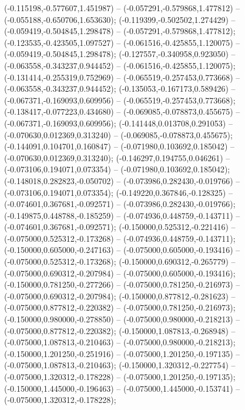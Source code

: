  (-0.115198,-0.577607,1.451987) -- (-0.057291,-0.579868,1.477812) -- (-0.055188,-0.650706,1.653630);
 (-0.119399,-0.502502,1.274429) -- (-0.059419,-0.504845,1.298478) -- (-0.057291,-0.579868,1.477812);
 (-0.123535,-0.423505,1.097527) -- (-0.061516,-0.425855,1.120075) -- (-0.059419,-0.504845,1.298478);
 (-0.127557,-0.340958,0.923050) -- (-0.063558,-0.343237,0.944452) -- (-0.061516,-0.425855,1.120075);
 (-0.131414,-0.255319,0.752969) -- (-0.065519,-0.257453,0.773668) -- (-0.063558,-0.343237,0.944452);
 (-0.135053,-0.167173,0.589426) -- (-0.067371,-0.169093,0.609956) -- (-0.065519,-0.257453,0.773668);
 (-0.138417,-0.077223,0.434680) -- (-0.069085,-0.078873,0.455675) -- (-0.067371,-0.169093,0.609956);
 (-0.141448,0.013708,0.291053) -- (-0.070630,0.012369,0.313240) -- (-0.069085,-0.078873,0.455675);
 (-0.144091,0.104701,0.160847) -- (-0.071980,0.103692,0.185042) -- (-0.070630,0.012369,0.313240);
 (-0.146297,0.194755,0.046261) -- (-0.073106,0.194071,0.073354) -- (-0.071980,0.103692,0.185042);
 (-0.148018,0.282823,-0.050702) -- (-0.073986,0.282430,-0.019766) -- (-0.073106,0.194071,0.073354);
 (-0.149220,0.367846,-0.128325) -- (-0.074601,0.367681,-0.092571) -- (-0.073986,0.282430,-0.019766);
 (-0.149875,0.448788,-0.185259) -- (-0.074936,0.448759,-0.143711) -- (-0.074601,0.367681,-0.092571);
 (-0.150000,0.525312,-0.221416) -- (-0.075000,0.525312,-0.173268) -- (-0.074936,0.448759,-0.143711);
 (-0.150000,0.605000,-0.247163) -- (-0.075000,0.605000,-0.193416) -- (-0.075000,0.525312,-0.173268);
 (-0.150000,0.690312,-0.265779) -- (-0.075000,0.690312,-0.207984) -- (-0.075000,0.605000,-0.193416);
 (-0.150000,0.781250,-0.277266) -- (-0.075000,0.781250,-0.216973) -- (-0.075000,0.690312,-0.207984);
 (-0.150000,0.877812,-0.281623) -- (-0.075000,0.877812,-0.220382) -- (-0.075000,0.781250,-0.216973);
 (-0.150000,0.980000,-0.278850) -- (-0.075000,0.980000,-0.218213) -- (-0.075000,0.877812,-0.220382);
 (-0.150000,1.087813,-0.268948) -- (-0.075000,1.087813,-0.210463) -- (-0.075000,0.980000,-0.218213);
 (-0.150000,1.201250,-0.251916) -- (-0.075000,1.201250,-0.197135) -- (-0.075000,1.087813,-0.210463);
 (-0.150000,1.320312,-0.227754) -- (-0.075000,1.320312,-0.178228) -- (-0.075000,1.201250,-0.197135);
 (-0.150000,1.445000,-0.196463) -- (-0.075000,1.445000,-0.153741) -- (-0.075000,1.320312,-0.178228);
